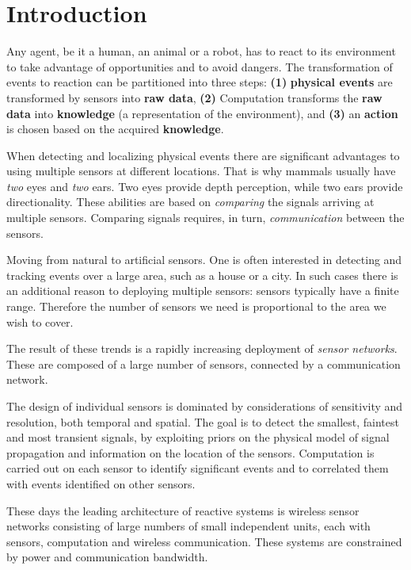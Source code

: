 \section{Introduction}
Any agent, be it a human, an animal or a robot, has to react to its
environment to take advantage of opportunities and to avoid
dangers. The transformation of events to reaction can be partitioned
into three steps: {\bf(1)} {\bf physical events} are transformed by
sensors into {\bf raw data}, {\bf (2)} Computation transforms the {\bf
  raw data} into {\bf knowledge} (a representation of the
environment), and {\bf (3)} an {\bf action} is chosen based on the
acquired {\bf knowledge}.


When detecting and localizing physical events there are significant
advantages to using multiple sensors at different
locations. That is why mammals usually have {\em two} eyes and {\em two}
ears. Two eyes provide depth perception, while two ears
provide directionality. These
abilities are based on {\em comparing} the signals arriving at multiple sensors. 
Comparing signals requires, in turn, {\em
  communication} between the sensors.

Moving from natural to artificial sensors. One is often interested in
detecting and tracking events over a large area, such as a house or a
city. In such cases there is an additional reason to deploying
multiple sensors: sensors typically have a finite range. Therefore the
number of sensors we need is proportional to the area we wish to
cover.

The result of these trends is a rapidly increasing deployment of
{\em  sensor networks}. These are composed
of a large number of sensors, connected by a communication network.

The design of individual sensors is dominated by considerations of
sensitivity and resolution, both temporal and spatial.  The goal is to
detect the smallest, faintest and most transient signals, by
exploiting priors on the physical model of signal propagation and
information on the location of the sensors. Computation is carried out
on each sensor to identify significant events and to correlated them
with events identified on other sensors.

These days the leading architecture of reactive systems is wireless
sensor networks consisting of large numbers of small
independent units, each with sensors, computation and wireless
communication. These systems are constrained by power and communication
bandwidth.

